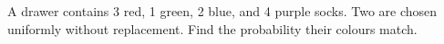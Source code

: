 A drawer contains 3 red, 1 green, 2 blue, and 4 purple socks. Two are chosen uniformly without replacement. Find the probability their colours match.
